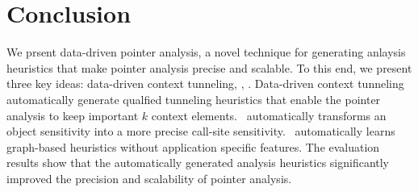 \chapter{Conclusion}\label{sec:Conclusion}
We prsent data-driven pointer analysis, a novel technique for generating anlaysis heuristics that make pointer analysis precise and scalable. 
To this end, we present three key ideas: data-driven context tunneling, \ourtechnique, \Graphick. Data-driven context tunneling automatically generate qualfied tunneling heuristics that enable the pointer analysis to keep important $k$ context elements. \ourtechnique~automatically transforms an object sensitivity into a more precise call-site sensitivity. \Graphick~automatically learns graph-based heuristics without application specific features. The evaluation results show that the automatically generated analysis heuristics significantly improved the precision and scalability of pointer analysis. 









